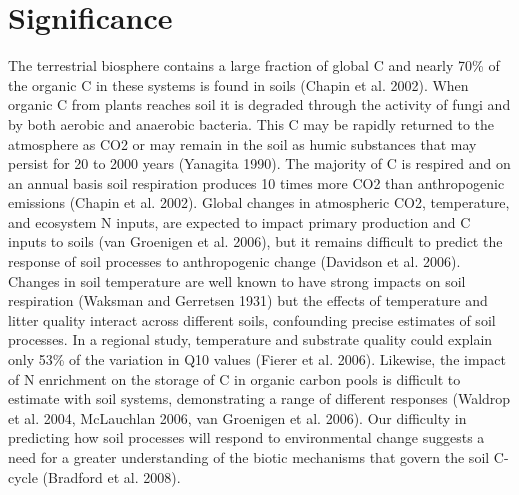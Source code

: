 \section{Significance} 

The terrestrial biosphere contains a large fraction of global C and nearly 70\% of the organic C in these systems is found in soils (Chapin et al. 2002). When organic C from plants reaches soil it is degraded through the activity of fungi and by both aerobic and anaerobic bacteria. This C may be rapidly returned to the atmosphere as CO2 or may remain in the soil as humic substances that may persist for 20 to 2000 years (Yanagita 1990). The majority of C is respired and on an annual basis soil respiration produces 10 times more CO2 than anthropogenic emissions (Chapin et al. 2002). Global changes in atmospheric CO2, temperature, and ecosystem N inputs, are expected to impact primary production and C inputs to soils (van Groenigen et al. 2006), but it remains difficult to predict the response of soil processes to anthropogenic change (Davidson et al. 2006). Changes in soil temperature are well known to have strong impacts on soil respiration (Waksman and Gerretsen 1931) but the effects of temperature and litter quality interact across different soils, confounding precise estimates of soil processes. In a regional study, temperature and substrate quality could explain only 53\% of the variation in Q10 values (Fierer et al. 2006). Likewise, the impact of N enrichment on the storage of C in organic carbon pools is difficult to estimate with soil systems, demonstrating a range of different responses (Waldrop et al. 2004, McLauchlan 2006, van Groenigen et al. 2006). Our difficulty in predicting how soil processes will respond to environmental change suggests a need for a greater understanding of the biotic mechanisms that govern the soil C-cycle (Bradford et al. 2008).